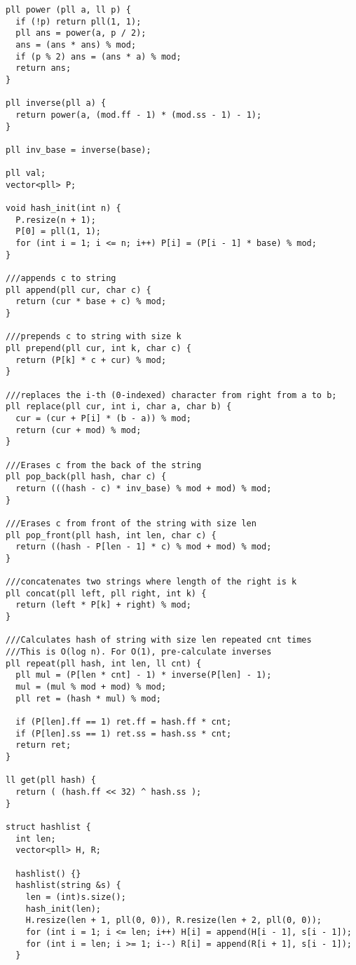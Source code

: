 \documentclass[10pt,a4paper,onesided]{article}
\begin{document}
\begin{multicols*}{3}
\begin{lstlisting}
pll power (pll a, ll p) {
  if (!p) return pll(1, 1);
  pll ans = power(a, p / 2);
  ans = (ans * ans) % mod;
  if (p % 2) ans = (ans * a) % mod;
  return ans;
}

pll inverse(pll a) {
  return power(a, (mod.ff - 1) * (mod.ss - 1) - 1);
}

pll inv_base = inverse(base);

pll val;
vector<pll> P;

void hash_init(int n) {
  P.resize(n + 1);
  P[0] = pll(1, 1);
  for (int i = 1; i <= n; i++) P[i] = (P[i - 1] * base) % mod;
}

///appends c to string
pll append(pll cur, char c) {
  return (cur * base + c) % mod;
}

///prepends c to string with size k
pll prepend(pll cur, int k, char c) {
  return (P[k] * c + cur) % mod;
}

///replaces the i-th (0-indexed) character from right from a to b;
pll replace(pll cur, int i, char a, char b) {
  cur = (cur + P[i] * (b - a)) % mod;
  return (cur + mod) % mod;
}

///Erases c from the back of the string
pll pop_back(pll hash, char c) {
  return (((hash - c) * inv_base) % mod + mod) % mod;
}

///Erases c from front of the string with size len
pll pop_front(pll hash, int len, char c) {
  return ((hash - P[len - 1] * c) % mod + mod) % mod;
}

///concatenates two strings where length of the right is k
pll concat(pll left, pll right, int k) {
  return (left * P[k] + right) % mod;
}

///Calculates hash of string with size len repeated cnt times
///This is O(log n). For O(1), pre-calculate inverses
pll repeat(pll hash, int len, ll cnt) {
  pll mul = (P[len * cnt] - 1) * inverse(P[len] - 1);
  mul = (mul % mod + mod) % mod;
  pll ret = (hash * mul) % mod;

  if (P[len].ff == 1) ret.ff = hash.ff * cnt;
  if (P[len].ss == 1) ret.ss = hash.ss * cnt;
  return ret;
}

ll get(pll hash) {
  return ( (hash.ff << 32) ^ hash.ss );
}

struct hashlist {
  int len;
  vector<pll> H, R;

  hashlist() {}
  hashlist(string &s) {
    len = (int)s.size();
    hash_init(len);
    H.resize(len + 1, pll(0, 0)), R.resize(len + 2, pll(0, 0));
    for (int i = 1; i <= len; i++) H[i] = append(H[i - 1], s[i - 1]);
    for (int i = len; i >= 1; i--) R[i] = append(R[i + 1], s[i - 1]);
  }
  

\end{lstlisting}
\end{multicols*}
\end{document}

